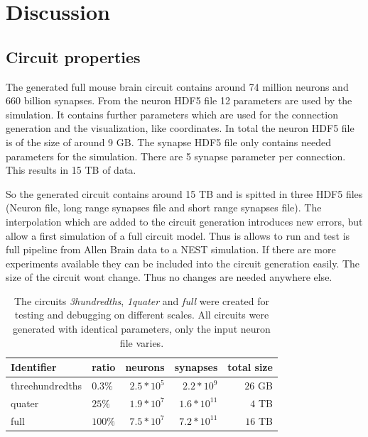 %

\chapter{Discussion}

\section{Circuit properties}


The generated full mouse brain circuit contains around 74 million neurons and 660 billion synapses.
From the neuron HDF5 file 12 parameters are used by the simulation.
It contains further parameters which are used for the connection generation and the visualization,
like coordinates. In total the neuron HDF5 file is of the size of around 9 GB.
The synapse HDF5 file only contains needed parameters for the simulation.
There are 5 synapse parameter per connection. This results in 15 TB of data.

So the generated circuit contains around 15 TB and is spitted in three HDF5 files (Neuron file, long range synapses file and short range synapses file). The interpolation which are added to the circuit generation introduces new errors, but allow
a first simulation of a full circuit model. Thus is allows to run and test is full pipeline from Allen Brain data to a NEST simulation. If there are more experiments available they can be included into
the circuit generation easily. The size of the circuit wont change. Thus no changes are needed anywhere else.


\begin{table}[ht!]
\begin{centering}
    \begin{tabular}{ | l | l | r | r | r |}
    \hline
    Identifier & ratio & neurons & synapses & total size \\ \hline \hline
    threehundredths & $0.3\%$ & $~2.5*10^5$ & $~2.2*10^9$ & $~26$ GB \\ \hline
    quater & $25\%$ & $~1.9*10^7$ & $~1.6*10^{11}$ & $~4$ TB \\ \hline
    full & $100\%$ & $~7.5*10^7$ & $~7.2*10^{11}$ & $~16$ TB \\ \hline
    \end{tabular}
    \caption{The circuits \emph{3hundredths}, \emph{1quater} and \emph{full} were created for testing and debugging on different scales.
All circuits were generated with identical parameters, only the input neuron file varies.}
\end{centering}
    \end{table}


